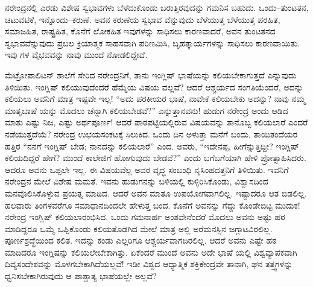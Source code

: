 ನರೇಂದ್ರನಲ್ಲಿ ಎರಡು ವಿಶೇಷ ಸ್ವಭಾವಗಳು ಬೆಳೆದುಕೊಂಡು ಬರುತ್ತಿರವುದನ್ನು ಗಮನಿಸ ಬಹುದು. ಒಂದು–ತುಂಟತನ, ಚಟುವಟಿಕೆ, ಇನ್ನೊಂದು–ಕರುಣೆ. ಅವನ ಕರುಣೆಯ ಸ್ವಭಾವ ವೆನ್ನುವುದು ಬೆಳೆಯುತ್ತ ಬೆಳೆಯುತ್ತ ಪರಹಿತ, ಸಮಾಜಹಿತ, ರಾಷ್ಟ್ರಹಿತ, ಕೊನೆಗೆ ಲೋಕಹಿತ ಇವುಗಳನ್ನು ಸಾಧಿಸಲು ಕಾರಣವಾದರೆ, ಅವನ ತುಂಟತನದ ಸ್ವಭಾವವೆನ್ನುವುದು ಪ್ರಬಲ ಕ್ರಿಯಾತ್ಮಕ ಸಾಹಸವಾಗಿ ಪರಿಣಮಿಸಿ, ಬೃಹತ್ಕಾರ್ಯಗಳನ್ನು ಸಾಧಿಸಲು ಕಾರಣವಾಯಿತು. ಇವು ಗಳ ವೈಭವವನ್ನು ನಾವು ಮುಂದೆ ನೋಡಲಿದ್ದೇವೆ.

ಮೆಟ್ರೋಪಾಲಿಟನ್ ಶಾಲೆಗೆ ಸೇರಿದ ನರೇಂದ್ರನಿಗೆ, ತಾನು ಇಂಗ್ಲಿಷ್ ಭಾಷೆಯನ್ನು ಕಲಿಯಬೇಕಾಗುತ್ತದೆ ಎನ್ನುವುದು ತಿಳಿಯಿತು. ಇಂಗ್ಲಿಷ್ ಕಲಿಯುವುದೆಂದರೆ ಹೆಮ್ಮೆಯ ವಿಷಯ ವಲ್ಲವೆ? ಆದರೆ ಆಶ್ಚರ್ಯದ ಸಂಗತಿಯೆಂದರೆ, ಅದನ್ನು ಕಲಿಯಲು ಅವನಿಗೆ ಮಾತ್ರ ಇಷ್ಟವೇ ಇಲ್ಲ! “ಅದು ಪರಕೀಯರ ಭಾಷೆ, ನಾವೇಕೆ ಕಲಿಯಬೇಕು ಅದನ್ನು? ನಾವು ನಮ್ಮ ಮಾತೃಬಾಷೆ ಯನ್ನು ಮೊದಲು ಚೆನ್ನಾಗಿ ಕಲಿಯಬೇಡವೆ?” ಎನ್ನುತ್ತಾನವನು! ಹುಡುಗ ನರೇಂದ್ರ ಅಂದು ಆಡಿದ ಮಾತು ಎಷ್ಟು ನಿಜ, ಎಷ್ಟು ಅರ್ಥಪೂರ್ಣ! ಆದರೆ ಪಾಠಪಟ್ಟಿಯಲ್ಲಿರುವ ವಿಷಯವನ್ನು ತಾನೊಬ್ಬ ಕಲಿಯಲಾರೆ ಎಂದರೆ ನಡೆಯುತ್ತದೆಯೆ? ನರೇಂದ್ರ ಉಭಯಸಂಕಟಕ್ಕೆ ಸಿಲುಕಿದ. ಒಂದು ದಿನ ಅಳುತ್ತಾ ಮನೆಗೆ ಬಂದು, ತಾಯಿತಂದೆಯರ ಹತ್ತಿರ “ನನಗೆ ಇಂಗ್ಲಿಷ್ ಬೇಡ; ನಾನದನ್ನು ಕಲಿಯಲಾರೆ” ಎಂದ. ಅವರು, “ಇದೇನಪ್ಪ, ಹೀಗೆನ್ನುತ್ತಿದ್ದೀ? ಇಂಗ್ಲಿಷ್ ಕಲಿಯದಿದ್ದರೆ ಹೇಗೆ? ಮುಂದೆ ಕಾಲೇಜಿಗೆ ಹೋಗುವುದು ಬೇಡವೆ?” ಎಂದು ಬಗೆಬಗೆಯಾಗಿ ಹೇಳಿ ಪ್ರೋತ್ಸಾಹಿಸಿದರು. ಆದರೂ ಅವನು ಒಪ್ಪಲೇ ಇಲ್ಲ. ಈ ವಿಷಯವೆಲ್ಲ ಅವರ ವೃದ್ಧ ಸಂಬಂಧಿ ನೃಸಿಂಹದತ್ತನಿಗೆ ತಿಳಿಯಿತು. ಇವನಿಗೆ ನರೇಂದ್ರನ ಮೇಲೆ ವಿಶೇಷ ಮಮತೆ. ಇವನು ಹುಡುಗನನ್ನು ಬಳಿಯಲ್ಲಿ ಕುಳ್ಳಿರಿಸಿಕೊಂಡು, ವಿಶ್ವಾಸದಿಂದ ಮನವೊಲಿಸಿಕೊಳ್ಳುವ ಪ್ರಯತ್ನ ಮಾಡಿದ. ಆದರೆ ಅವನ ಮಾತೂ ಉಪಯೋಗವಾಗಲಿಲ್ಲ. ಇಷ್ಟಾದರೂ ಆತ ಬಿಡಲಿಲ್ಲ. ಹಲವಾರು ತಿಂಗಳವರೆಗೂ ಸಮಾಧಾನದಿಂದಲೇ ಹೇಳುತ್ತ ಬಂದ. ಕೊನೆಗೆ ಅವನನ್ನು ಗೆದ್ದು ಕೊಂಡೇಬಿಟ್ಟ ಮುದುಕ! ನರೇಂದ್ರ ಇಂಗ್ಲಿಷ್ ಕಲಿಯಲಾರಂಭಿಸಿದ. ಒಂದು ಗಮನಾರ್ಹ ಅಂಶವೇನೆಂದರೆ ಮೊದಲು ಅವನು ಅಷ್ಟು ಹಠ ಮಾಡಿದ್ದರೂ ಒಮ್ಮೆ ಒಪ್ಪಿಕೊಂಡು ಕಲಿಯತೊಡಗಿದ ಮೇಲೆ ಮಾತ್ರ ಅಲ್ಲಿ ಅರೆಮನಸ್ಸಿನ ಜಗ್ಗಾಟವಿರಲಿಲ್ಲ. ಪೂರ್ಣಶ್ರದ್ಧೆಯಿಂದ ಕಲಿತ. ಇದನ್ನು ಕಂಡು ಎಲ್ಲರಿಗೂ ಆಶ್ಚರ್ಯವಾಗದಿರಲಿಲ್ಲ. ಆದರೆ ಅವನು ಎಷ್ಟೇ ಹಠ ಮಾಡಿದರೂ ಇಂಗ್ಲಿಷನ್ನು ಕಲಿಯಲೇಬೇಕಾಗಿತ್ತು. ಏಕೆಂದರೆ ಮುಂದೆ ಅವನು ಅದೇ ಭಾಷೆ ಯಲ್ಲಿ ವಿಶ್ವವ್ಯಾಪಕವಾಗಿ ದಿವ್ಯಸಂದೇಶವನ್ನು ಮೊಳಗಬೇಕಾಗಿದೆಯಲ್ಲವೆ! ಇಡೀ ವಿಶ್ವದ ಆಧ್ಯಾತ್ಮಿಕ ಶಕ್ತಿಕೇಂದ್ರವೇ ತಾನಾಗಿ, ಘನ ತತ್ತ್ವಗಳನ್ನು ಧ್ವನಿಸಬೇಕಾಗಿರುವುದು ಆ ಪಾಶ್ಚಾತ್ಯ ಭಾಷೆಯಲ್ಲೇ ಅಲ್ಲವೆ?

